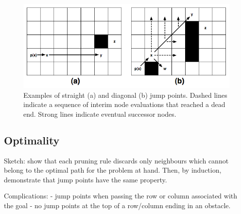 \begin{figure}[tb]
       \begin{center}
		   \includegraphics[scale=0.35, trim = 10mm 10mm 10mm 0mm]
			{diagrams/jumppoints.png}
       \end{center}
	\vspace{-3pt}
       \caption{Examples of straight (a) and diagonal (b) jump points.
Dashed lines indicate a sequence of interim node evaluations that reached
a dead end. Strong lines indicate eventual successor nodes.}
       \label{fig:jumppoints}
\end{figure}

\subsection{Optimality}

Sketch: show that each pruning rule discards only neighbours
which cannot belong to the optimal path for the problem at hand.
Then, by induction, demonstrate that jump points have the same 
property. 

Complications:
 - jump points when passing the row or column associated with the goal
 - no jump points at the top of a row/column ending in an obstacle.

